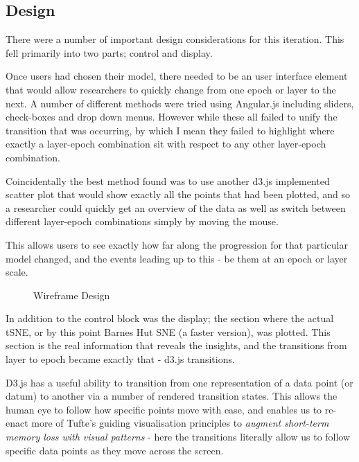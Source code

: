 \documentclass[a4paper,11pt,titlepage]{article}
\begin{document}
	\subsection{Design}	
	There were a number of important design considerations for this iteration. This fell primarily into two parts; control and display.
	\par 
	Once users had chosen their model, there needed to be an user interface element that would allow researchers to quickly change from one epoch or layer to the next. A number of different methods were tried using Angular.js including sliders, check-boxes and drop down menus. However while these all failed to unify the transition that was occurring, by which I mean they failed to highlight where exactly a layer-epoch combination sit with respect to any other layer-epoch combination. 
	\par 
	Coincidentally the best method found was to use another d3.js implemented scatter plot that would show exactly all the points that had been plotted, and so a researcher could quickly get an overview of the data as well as switch between different layer-epoch combinations simply by moving the mouse. 
	\par 
	This allows users to see exactly how far along the progression for that particular model changed, and the events leading up to this - be them at an epoch or layer scale.  

	\begin{figure}[H]
    			\caption{Wireframe Design}%
	\end{figure}	
	
	In addition to the control block was the display; the section where the actual tSNE, or by this point Barnes Hut SNE (a faster version), was plotted. This section is the real information that reveals the insights, and the transitions from layer to epoch became exactly that - d3.js transitions. 
	\par 
	D3.js has a useful ability to transition from one representation of a data point (or datum) to another via a number of rendered transition states. This allows the human eye to follow how specific points move with ease, and enables us to re-enact more of Tufte's guiding visualisation principles to \textit{augment short-term memory loss with visual patterns} - here the transitions literally allow us to follow specific data points as they move across the screen.
	\par 
\end{document}
